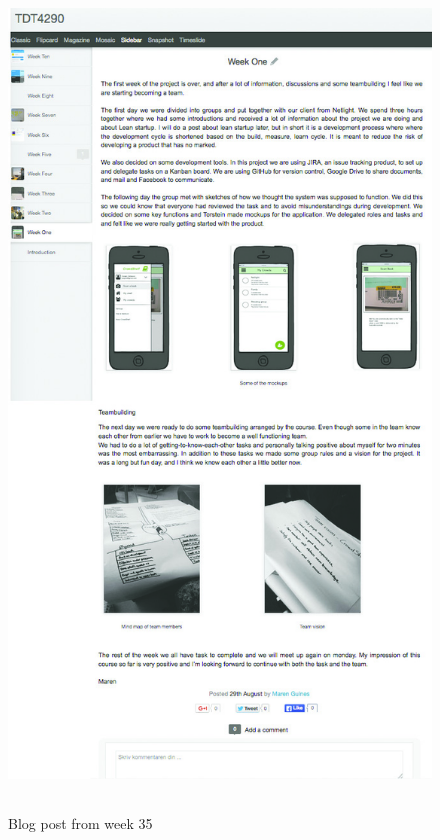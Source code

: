 \newpage
\begin{figure}
\centering
\includegraphics[height=22cm]{figs/v01/WeekOne.jpg}
\caption{Blog post from week 35}
\label{fig:week-one}
\end{figure}

